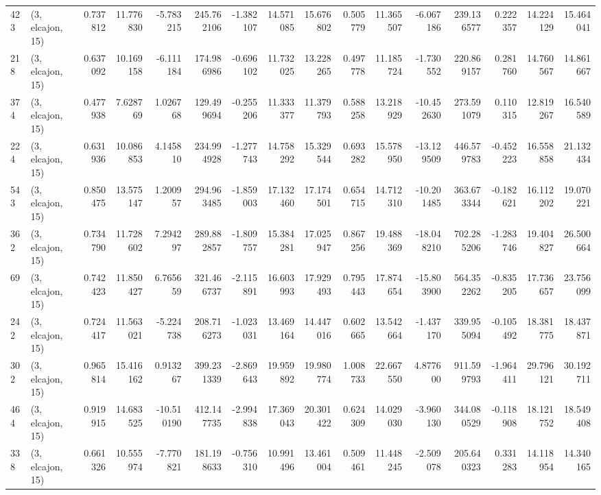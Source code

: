 \begin{tabular}{llrrrrrrrrrrrrrr}
423 &  (3, elcajon, 15) &   0.737812 &  11.776830 &  -5.783215 &   245.762106 &  -1.382107 &  14.571085 &  15.676802 &  0.505779 &  11.365507 &  -6.067186 &    239.136577 &   0.222357 &  14.224129 &   15.464041 \\
218 &  (3, elcajon, 15) &   0.637092 &  10.169158 &  -6.111184 &   174.986986 &  -0.696102 &  11.732025 &  13.228265 &  0.497778 &  11.185724 &  -1.730552 &    220.869157 &   0.281760 &  14.760567 &   14.861667 \\
374 &  (3, elcajon, 15) &   0.477938 &   7.628769 &   1.026768 &   129.499694 &  -0.255206 &  11.333377 &  11.379793 &  0.588258 &  13.218929 & -10.452630 &    273.591079 &   0.110315 &  12.819267 &   16.540589 \\
224 &  (3, elcajon, 15) &   0.631936 &  10.086853 &   4.145810 &   234.994928 &  -1.277743 &  14.758292 &  15.329544 &  0.693282 &  15.578950 & -13.129509 &    446.579783 &  -0.452223 &  16.558858 &   21.132434 \\
543 &  (3, elcajon, 15) &   0.850475 &  13.575147 &   1.200957 &   294.963485 &  -1.859003 &  17.132460 &  17.174501 &  0.654715 &  14.712310 & -10.201485 &    363.673344 &  -0.182621 &  16.112202 &   19.070221 \\
362 &  (3, elcajon, 15) &   0.734790 &  11.728602 &   7.294297 &   289.882857 &  -1.809757 &  15.384281 &  17.025947 &  0.867256 &  19.488369 & -18.048210 &    702.285206 &  -1.283746 &  19.404827 &   26.500664 \\
69  &  (3, elcajon, 15) &   0.742423 &  11.850427 &   6.765659 &   321.466737 &  -2.115891 &  16.603993 &  17.929493 &  0.795443 &  17.874654 & -15.803900 &    564.352262 &  -0.835205 &  17.736657 &   23.756099 \\
242 &  (3, elcajon, 15) &   0.724417 &  11.563021 &  -5.224738 &   208.716273 &  -1.023031 &  13.469164 &  14.447016 &  0.602665 &  13.542664 &  -1.437170 &    339.955094 &  -0.105492 &  18.381775 &   18.437871 \\
302 &  (3, elcajon, 15) &   0.965814 &  15.416162 &   0.913267 &   399.231339 &  -2.869643 &  19.959892 &  19.980774 &  1.008733 &  22.667550 &   4.877600 &    911.599793 &  -1.964411 &  29.796121 &   30.192711 \\
464 &  (3, elcajon, 15) &   0.919915 &  14.683525 & -10.510190 &   412.147735 &  -2.994838 &  17.369043 &  20.301422 &  0.624309 &  14.029030 &  -3.960130 &    344.080529 &  -0.118908 &  18.121752 &   18.549408 \\
338 &  (3, elcajon, 15) &   0.661326 &  10.555974 &  -7.770821 &   181.198633 &  -0.756310 &  10.991496 &  13.461004 &  0.509461 &  11.448245 &  -2.509078 &    205.640323 &   0.331283 &  14.118954 &   14.340165 \\

\end{tabular}
